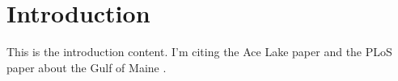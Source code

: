 \chapter{Introduction} 
\label{ch:intro}

This is the introduction content. I'm citing the Ace Lake paper \cite{Lauro:2010jna} and the PLoS paper about the Gulf of Maine \cite{Li:2011ki}.
